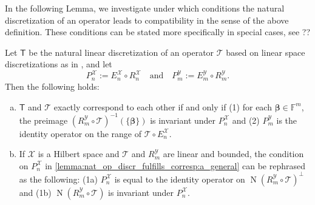 \documentclass[a4paper]{paper}
\newcommand{\Spc}[1]{\mathscr{#1}}
\newcommand{\Field}{\mathbb{F}}
\newcommand{\Op}[1]{\mathcal{#1}}
\newcommand{\DiscOp}[1]{\mathsf{#1}}
\newcommand*{\EXT}[2]{\ensuremath{E_{#1}^{#2}}}
\newcommand*{\REST}[2]{\ensuremath{R_{#1}^{#2}}}
\newcommand*{\PROJ}[2]{\ensuremath{P_{#1}^{#2}}}
\newcommand*{\RnX}{\ensuremath{\REST{n}{\Spc{X}}}}
\newcommand*{\RmY}{\ensuremath{\REST{m}{\Spc{Y}}}}
\newcommand*{\EnX}{\ensuremath{\EXT{n}{\Spc{X}}}}
\newcommand*{\EmY}{\ensuremath{\EXT{m}{\Spc{Y}}}}
\newcommand*{\PnX}{\ensuremath{\PROJ{n}{\Spc{X}}}}
\newcommand*{\PmY}{\ensuremath{\PROJ{m}{\Spc{Y}}}}
\DeclareMathOperator{\nullspace}{N}
\newcommand{\vbeta}{\boldsymbol{\beta}}
\begin{document}
In the following Lemma, we investigate under which conditions the natural discretization of an operator leads to 
compatibility in the sense of the above definition. These conditions can be stated more specifically in special cases, 
see ??

\begin{lemma}
 \label{lemma:nat_op_discr_fulfills_corresp}
 Let $\DiscOp{T}$ be the natural linear discretization of an operator $\Op{T}$ based on linear space discretizations as 
 in , and let
 \begin{equation*}
  \PnX := \EnX \circ \RnX \quad \text{and} \quad \PmY := \EmY \circ \RmY.
 \end{equation*}
 Then the following holds:
 
 \begin{enumerate}[(a)]
  \item \label{lemma:nat_op_discr_fulfills_corresp:a_general}
  $\DiscOp{T}$ and $\Op{T}$ exactly correspond to each other if and only if (1) for each $\vbeta \in \Field^m$, the 
  preimage $(\RmY \circ \Op{T})^{-1}(\{\vbeta\})$ is invariant under $\PnX$ and (2) $\PmY$ is the identity operator on 
  the range of $\Op{T} \circ \EnX$.

  \item \label{lemma:nat_op_discr_fulfills_corresp:b_hilbert_linear}
  If $\Spc{X}$ is a Hilbert space and $\Op{T}$ and $\RmY$ are linear and bounded, the condition on $\PnX$ in 
  \eqref{lemma:nat_op_discr_fulfills_corresp:a_general} can be rephrased as the following: (1a) $\PnX$ is equal to the 
  identity operator on $\nullspace(\RmY \circ \Op{T})^\perp$ and (1b) $\nullspace(\RmY \circ \Op{T})$ is invariant 
  under $\PnX$.
  
 \end{enumerate}
\end{lemma}
\end{document}
